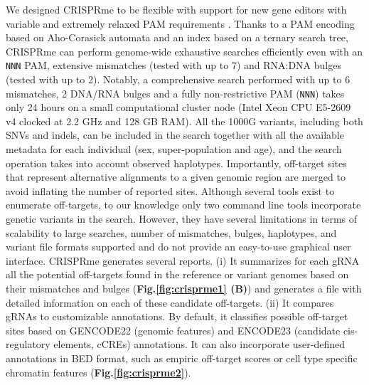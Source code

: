 \documentclass[a4paper, titlepage, openright]{book}
\begin{document}
We designed CRISPRme to be flexible with support for new gene editors with variable and extremely relaxed PAM requirements \citep{walton2020unconstrained}. Thanks to a PAM encoding based on Aho-Corasick automata and an index based on a ternary search tree, CRISPRme can perform genome-wide exhaustive searches efficiently even with an \texttt{NNN} PAM, extensive mismatches (tested with up to 7) and RNA:DNA bulges (tested with up to 2). Notably, a comprehensive search performed with up to 6 mismatches, 2 DNA/RNA bulges and a fully non-restrictive PAM (\texttt{NNN}) takes only 24 hours on a small computational cluster node (Intel Xeon CPU E5-2609 v4 clocked at 2.2 GHz and 128 GB RAM). All the 1000G variants, including both SNVs and indels, can be included in the search together with all the available metadata for each individual (sex, super-population and age), and the search operation takes into account observed haplotypes. Importantly, off-target sites that represent alternative alignments to a given genomic region are merged to avoid inflating the number of reported sites. Although several tools exist to enumerate off-targets, to our knowledge only two command line tools \citep{lessard2017human,fennell2021calitas} incorporate genetic variants in the search. However, they have several limitations in terms of scalability to large searches, number of mismatches, bulges, haplotypes, and variant file formats supported and do not provide an easy-to-use graphical user interface. CRISPRme generates several reports. (i) It summarizes for each gRNA all the potential off-targets found in the reference or variant genomes based on their mismatches and bulges (\textbf{Fig.\ref{fig:crisprme1} (B)}) and generates a file with detailed information on each of these candidate off-targets. (ii) It compares gRNAs to customizable annotations. By default, it classifies possible off-target sites based on GENCODE22 (genomic features) and ENCODE23 (candidate cis-regulatory elements, cCREs) annotations. It can also incorporate user-defined annotations in BED format, such as empiric off-target scores or cell type specific chromatin features (\textbf{Fig.\ref{fig:crisprme2}}). 
\end{document}
